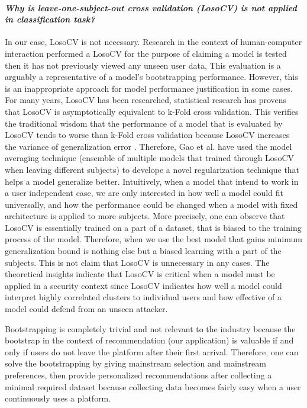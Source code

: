 \paragraph{\emph{Why is leave-one-subject-out cross validation (LosoCV) is not applied in classification task?}}

In our case, LosoCV is not necessary. Research in the context of human-computer interaction 
performed a LosoCV for the purpose of claiming a model is tested then it has not previously viewed 
any unseen user data,
This evaluation is a arguably a representative of a model's bootstrapping performance.
However, this is an inappropriate approach for model performance justification in some cases.
For many years, LosoCV has been researched, statistical research \cite{xu2012asymptotic} has provens 
that LosoCV is asymptotically equivalent to k-Fold cross validation. This verifies 
the traditional wisdom that the performance of 
a model that is evaluated by LosoCV tends to worse than k-Fold cross validation because
LosoCV increases the variance of generalization error \cite{bengio2004no}. Therefore, Gao et al. have used 
the model averaging technique (ensemble of multiple models that trained through LosoCV when 
leaving different subjects) to develope a novel regularization technique \cite{gao2016139} 
that helps a model generalize better.
Intuitively, when a model that intend to work in a user independent case, 
we are only interested in how well a model could fit universally, 
and how the performance could be changed when a model with fixed architecture is applied to more subjects.
More precisely, one can observe that LosoCV is essentially trained on a part of a dataset, 
that is biased to the training process of the model. Therefore, when we use 
the best model that gains minimum generalization bound is nothing else but a biased learning 
with a part of the subjects.
This is not claim that LosoCV is unnecessary in any cases. The theoretical insights indicate
that LosoCV is critical when a model must be applied in a security context since 
LosoCV indicates how well a model could interpret highly correlated clusters 
to individual users and how effective of a model could defend from an unseen attacker.

Bootstrapping is completely trivial and not relevant to the industry 
because the bootstrap in the context of recommendation (our application) is valuable if and only if
users do not leave the platform after their first arrival. Therefore, one can solve
the bootstrapping by giving mainstream selection and mainstream preferences, then provide
personalized recommendations after collecting a minimal required dataset because 
collecting data becomes fairly easy when a user continuously uses a platform.

